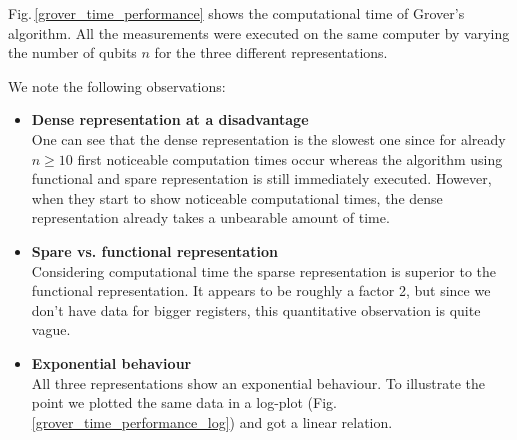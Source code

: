 \documentclass[bibliography=totocnumbered, 10pt]{article}
\theoremstyle{NoticeStyle}
\begin{document}
Fig.\,\ref{grover_time_performance} shows the computational time of Grover's algorithm. All the measurements were executed on the same computer by varying the number of qubits $n$ for the three different representations.

We note the following observations:
\begin{itemize}
	\item\textbf{Dense representation at a disadvantage}\\
	One can see that the dense representation is the slowest one since for already $n\geq 10$ first noticeable computation times occur whereas the algorithm using functional and spare representation is still immediately executed. However, when they start to show noticeable computational times, the dense representation already takes a unbearable amount of time.
	\item\textbf{Spare vs. functional representation}\\
	Considering computational time the sparse representation is superior to the functional representation. It appears to be roughly a factor 2, but since we don't have data for bigger registers, this quantitative observation is quite vague.
	\item\textbf{Exponential behaviour}\\
	All three representations show an exponential behaviour. To illustrate the point we plotted the same data in a log-plot (Fig.\,\ref{grover_time_performance_log}) and got a linear relation.
\end{itemize}
%
\end{document}
